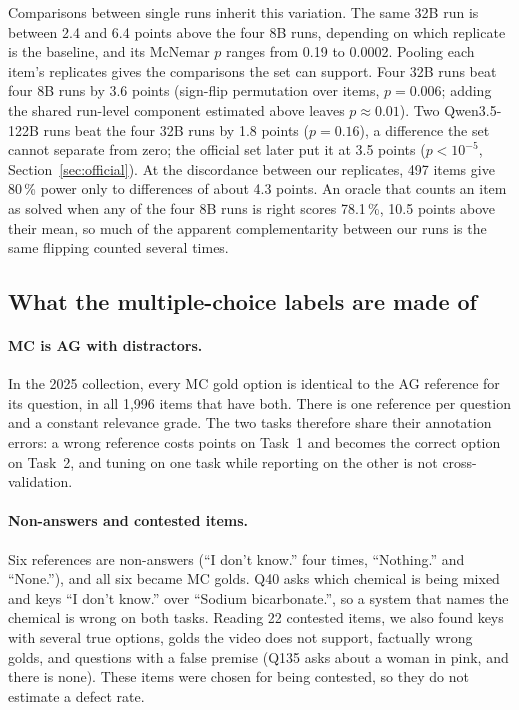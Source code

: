 \documentclass[sigconf,nonacm]{acmart}
\begin{document}
Comparisons between single runs inherit this variation. The same 32B run is
between 2.4 and 6.4 points above the four 8B runs, depending on which replicate
is the baseline, and its McNemar $p$ ranges from 0.19 to 0.0002. Pooling each
item's replicates gives the comparisons the set can support. Four 32B runs beat
four 8B runs by 3.6 points (sign-flip permutation over items, $p=0.006$; adding
the shared run-level component estimated above leaves $p\approx0.01$). Two
Qwen3.5-122B runs beat the four 32B runs by 1.8 points ($p=0.16$), a difference
the set cannot separate from zero; the official set later put it at 3.5 points
($p<10^{-5}$, Section~\ref{sec:official}). At the discordance between our
replicates, 497 items give 80\,\% power only to differences of about 4.3 points.
An oracle that counts an item as solved when any of the four 8B runs is right
scores 78.1\,\%, 10.5 points above their mean, so much of the apparent
complementarity between our runs is the same flipping counted several times.

\subsection{What the multiple-choice labels are made of}
\label{sec:benchmark}

\paragraph{MC is AG with distractors.}
In the 2025 collection, every MC gold option is identical to the AG reference
for its question, in all 1,996 items that have both. There is one reference per
question and a constant relevance grade. The two tasks therefore share their
annotation errors: a wrong reference costs points on Task~1 and becomes the
correct option on Task~2, and tuning on one task while reporting on the other is
not cross-validation.

\paragraph{Non-answers and contested items.}
Six references are non-answers (``I don't know.'' four times, ``Nothing.'' and
``None.''), and all six became MC golds. Q40 asks which chemical is being mixed
and keys ``I don't know.'' over ``Sodium bicarbonate.'', so a system that names
the chemical is wrong on both tasks. Reading 22 contested items, we also found
keys with several true options, golds the video does not support, factually
wrong golds, and questions with a false premise (Q135 asks about a woman in pink,
and there is none). These items were chosen for being contested, so they do not
estimate a defect rate.
\end{document}
